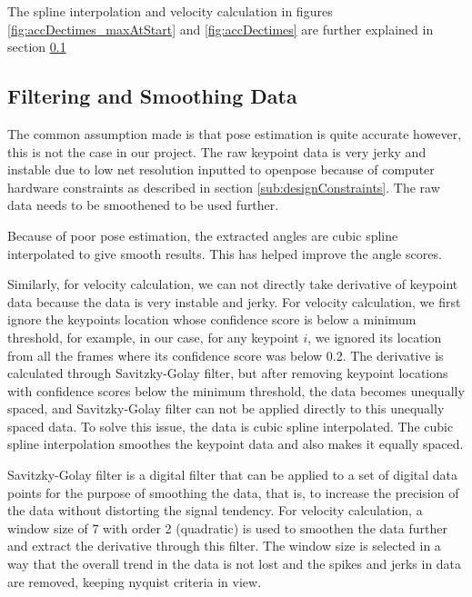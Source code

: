 The spline interpolation and velocity calculation in figures \ref{fig:accDectimes_maxAtStart} and \ref{fig:accDectimes} are further explained in section \ref{section:filteringSmoothing}

\subsection{Filtering and Smoothing Data}
\label{section:filteringSmoothing}
The common assumption made is that pose estimation is quite accurate however, this is not the case in our project. The raw keypoint data is very jerky and instable due to low net resolution inputted to openpose because of computer hardware constraints as described in section \ref{sub:designConstraints}. The raw data needs to be smoothened to be used further. 


Because of poor pose estimation, the extracted angles are cubic spline interpolated to give smooth results. This has helped improve the angle scores. 

Similarly, for velocity calculation, we can not directly take derivative of keypoint data because the data is very instable and jerky. For velocity calculation, we first ignore the keypoints location whose confidence score is below a minimum threshold, for example, in our case, for any keypoint $i$, we ignored its location from all the frames where its confidence score was below 0.2. The derivative is calculated through Savitzky-Golay filter, but after removing keypoint locations with confidence scores below the minimum threshold, the data becomes unequally spaced, and Savitzky-Golay filter can not be applied directly to this unequally spaced data. To solve this issue, the data is cubic spline interpolated. The cubic spline interpolation smoothes the keypoint data and also makes it equally spaced. 

Savitzky-Golay filter is a digital filter that can be applied to a set of digital data points for the purpose of smoothing the data, that is, to increase the precision of the data without distorting the signal tendency. For velocity calculation, a window size of 7 with order 2 (quadratic) is used to smoothen the data further and extract the derivative through this filter. The window size is selected in a way that the overall trend in the data is not lost and the spikes and jerks in data are removed, keeping nyquist criteria in view. 

